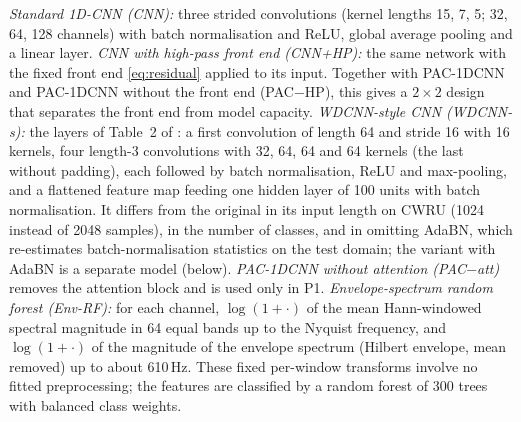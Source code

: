 \documentclass[conference]{IEEEtran}
\begin{document}
\emph{Standard 1D-CNN (CNN):} three strided convolutions (kernel lengths 15, 7, 5; 32, 64, 128 channels) with batch normalisation and ReLU, global average pooling and a linear layer. \emph{CNN with high-pass front end (CNN+HP):} the same network with the fixed front end \eqref{eq:residual} applied to its input. Together with PAC-1DCNN and PAC-1DCNN without the front end (PAC$-$HP), this gives a $2\times2$ design that separates the front end from model capacity. \emph{WDCNN-style CNN (WDCNN-s):} the layers of Table~2 of \cite{zhang2017wdcnn}: a first convolution of length 64 and stride 16 with 16 kernels, four length-3 convolutions with 32, 64, 64 and 64 kernels (the last without padding), each followed by batch normalisation, ReLU and max-pooling, and a flattened feature map feeding one hidden layer of 100 units with batch normalisation. It differs from the original in its input length on CWRU (1024 instead of 2048 samples), in the number of classes, and in omitting AdaBN, which re-estimates batch-normalisation statistics on the test domain; the variant with AdaBN is a separate model (below). \emph{PAC-1DCNN without attention (PAC$-$att)} removes the attention block and is used only in P1. \emph{Envelope-spectrum random forest (Env-RF):} for each channel, $\log(1+\cdot)$ of the mean Hann-windowed spectral magnitude in 64 equal bands up to the Nyquist frequency, and $\log(1+\cdot)$ of the magnitude of the envelope spectrum (Hilbert envelope, mean removed) up to about 610\,Hz. These fixed per-window transforms involve no fitted preprocessing; the features are classified by a random forest of 300 trees with balanced class weights.
\end{document}
